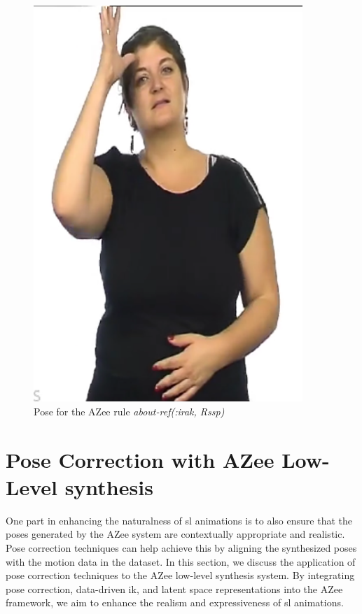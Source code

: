 \documentclass[../../main.tex]{subfiles}
\begin{document}
\begin{figure}
    \centering \includegraphics[width = 4in]{chapters/intermediate_blocks_pose_correction/images/about_ref_irak.png}
    \caption{Pose for the AZee rule \emph{about-ref(:irak, Rssp)}}
    \label{fig:about_ref_irak}
\end{figure}

\section{Pose Correction with AZee Low-Level synthesis}
\label{ch:intermediate_blocks_pose_correction:pose_correction_with_azee}

One part in enhancing the naturalness of \gls{sl} animations is to also ensure that the poses generated by the AZee system are contextually appropriate and realistic. Pose correction techniques can help achieve this by aligning the synthesized poses with the motion data in the dataset. In this section, we discuss the application of pose correction techniques to the AZee low-level synthesis system. By integrating pose correction, data-driven \gls{ik}, and latent space representations into the AZee framework, we aim to enhance the realism and expressiveness of \gls{sl} animations.
\end{document}
